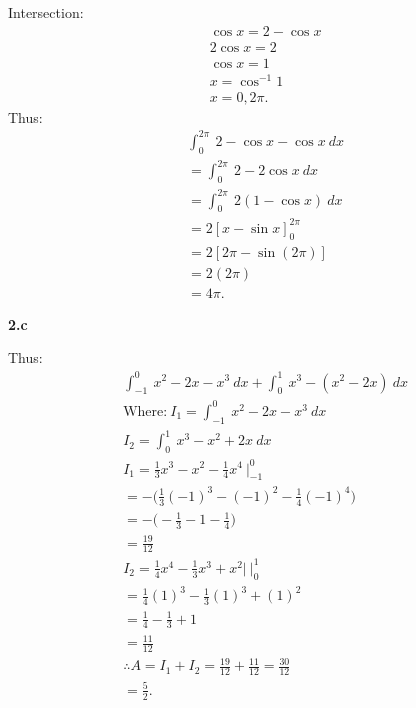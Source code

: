 \documentclass{report}
\begin{document}
    \begin{minipage}[]{0.47\textwidth}
    Intersection:
    \begin{align*}
        &\cos{x} = 2-\cos{x} \\
        & 2\cos{x} = 2 \\
        &\cos{x} = 1 \\
        &x= \cos^{-1}{1} \\
        &x=0,2\pi
    .\end{align*}
    \bigbreak \noindent 
    Thus:
    \begin{align*}
        &\int_{0}^{2\pi}\ 2-\cos{x} - \cos{x}\ dx \\
        &=\int_{0}^{2\pi}\ 2-2\cos{x}\ dx \\
        &=\int_{0}^{2\pi}\ 2(1-\cos{x})\ dx \\
        &=2 \left[x-\sin{x}\right]^{2\pi}_0 \\
        &= 2 [2\pi-\sin{(2\pi)}] \\
        &= 2 (2\pi) \\
        &= 4\pi
    .\end{align*}
    \end{minipage}

    \pagebreak \bigbreak \noindent 
    \textbf{2.c}
    \bigbreak \noindent 
    \begin{minipage}[]{0.47\textwidth}
    \end{minipage}
    \begin{minipage}[]{0.47\textwidth}
    Thus:
    \begin{align*}
        &\int_{-1}^{0}\ x^{2}-2x - x^{3}\ dx + \int_{0}^{1}\ x^{3}-(x^{2}-2x)\ dx \\
        &\text{Where:}\ I_{1} = \int_{-1}^{0}\ x^{2} - 2x -x^{3}\ dx  \\
        &I_{2} = \int_{0}^{1}\ x^{3}-x^{2}+2x\ dx\\
        &I_{1} =  \frac{1}{3}x^{3}-x^{2}-\frac{1}{4}x^{4}\ \bigg|_{-1}^{0} \\
        &= -\bigg(\frac{1}{3}(-1)^{3}-(-1)^{2}-\frac{1}{4}(-1)^{4}\bigg) \\
        &= -\bigg(-\frac{1}{3}-1-\frac{1}{4}\bigg) \\
        &=\frac{19}{12} \\
        &I_{2} = \frac{1}{4}x^{4}-\frac{1}{3}x^{3}+x^{2}|\ \bigg|_{0}^{1} \\
        &= \frac{1}{4}(1)^{3}-\frac{1}{3}(1)^{3}+(1)^{2} \\
        &= \frac{1}{4}-\frac{1}{3}+1 \\
        &=\frac{11}{12} \\
        &\therefore A = I_{1} + I_{2} = \frac{19}{12} + \frac{11}{12} = \frac{30}{12}  \\
        &= \frac{5}{2} 
    .\end{align*}
    \end{minipage}
\end{document}
